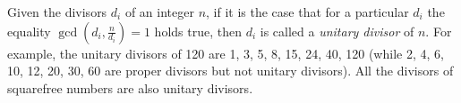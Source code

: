 \documentclass[12pt]{article}
\begin{document}
Given the divisors $d_i$ of an integer $n$, if it is the case that for a particular $d_i$ the equality $\gcd(d_i, \frac{n}{d_i}) = 1$ holds true, then $d_i$ is called a {\em unitary divisor} of $n$. For example, the unitary divisors of 120 are 1, 3, 5, 8, 15, 24, 40, 120 (while 2, 4, 6, 10, 12, 20, 30, 60 are proper divisors but not unitary divisors). All the divisors of squarefree numbers are also unitary divisors.
\end{document}
